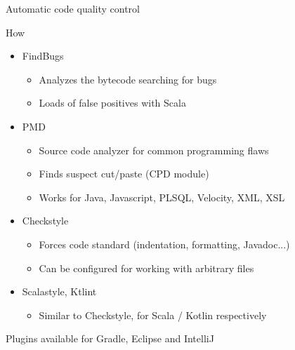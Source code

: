 \documentclass[presentation]{beamer}
\begin{document}
\begin{frame}[fragile]{Automatic code quality control}
	\begin{block}{How}
		\begin{itemize}
			\item FindBugs
			\begin{itemize}
				\item Analyzes the bytecode searching for bugs
				\item Loads of false positives with Scala
			\end{itemize}
			\item PMD
			\begin{itemize}
				\item Source code analyzer for common programming flaws
				\item Finds suspect cut/paste (CPD module)
				\item Works for Java, Javascript, PLSQL, Velocity, XML, XSL
			\end{itemize}
			\item Checkstyle
			\begin{itemize}
				\item Forces code standard (indentation, formatting, Javadoc...)
				\item Can be configured for working with arbitrary files
			\end{itemize}
			\item Scalastyle, Ktlint
			\begin{itemize}
				\item Similar to Checkstyle, for Scala / Kotlin respectively
			\end{itemize}
		\end{itemize}
	Plugins available for Gradle, Eclipse and IntelliJ
	\end{block}
\end{frame}
\end{document}
